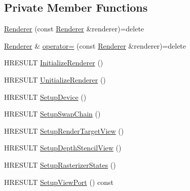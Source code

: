 \subsection*{Private Member Functions}
\begin{DoxyCompactItemize}
\item 
\hyperlink{classmage_1_1_renderer_acd6b509da2bd7e7d764b45b912fe5298}{Renderer} (const \hyperlink{classmage_1_1_renderer}{Renderer} \&renderer)=delete
\item 
\hyperlink{classmage_1_1_renderer}{Renderer} \& \hyperlink{classmage_1_1_renderer_a2762ead5f771ae95e4293cd7eb1a2834}{operator=} (const \hyperlink{classmage_1_1_renderer}{Renderer} \&renderer)=delete
\item 
H\+R\+E\+S\+U\+LT \hyperlink{classmage_1_1_renderer_aafed50e7e14ca597541c091941351929}{Initialize\+Renderer} ()
\item 
H\+R\+E\+S\+U\+LT \hyperlink{classmage_1_1_renderer_a308beaf67b11128f02e87778b6a9c3c7}{Unitialize\+Renderer} ()
\item 
H\+R\+E\+S\+U\+LT \hyperlink{classmage_1_1_renderer_a4ee0187fb63587a219798523fb8cb7a6}{Setup\+Device} ()
\item 
H\+R\+E\+S\+U\+LT \hyperlink{classmage_1_1_renderer_af2aa545594936261bf2639e4e0814a83}{Setup\+Swap\+Chain} ()
\item 
H\+R\+E\+S\+U\+LT \hyperlink{classmage_1_1_renderer_afe99715a4ae6432ba561dcab048f79b4}{Setup\+Render\+Target\+View} ()
\item 
H\+R\+E\+S\+U\+LT \hyperlink{classmage_1_1_renderer_a95a34b64e815b0e5e95ce539bbd0f5a3}{Setup\+Depth\+Stencil\+View} ()
\item 
H\+R\+E\+S\+U\+LT \hyperlink{classmage_1_1_renderer_a7f06b86e79a209bc4647a77cb3009c08}{Setup\+Rasterizer\+States} ()
\item 
H\+R\+E\+S\+U\+LT \hyperlink{classmage_1_1_renderer_a18937e12912fe18b935893dc6502b92f}{Setup\+View\+Port} () const
\end{DoxyCompactItemize}
